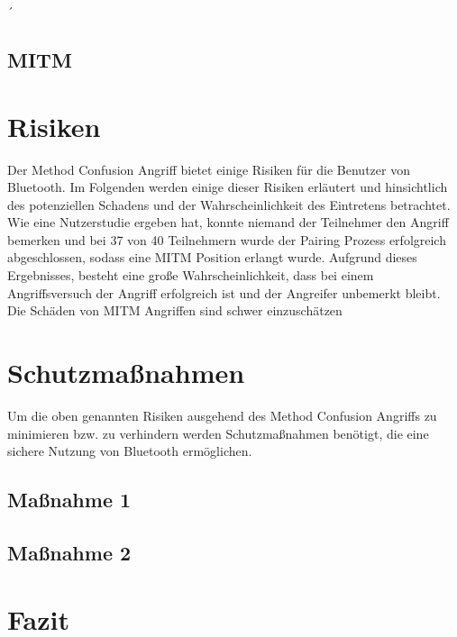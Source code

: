 ´\documentclass[
    a4paper,
    pagesize,
    pdftex,
    12pt,
]{scrartcl}
\begin{document}
    \subsection{MITM}

    \newpage
    \section{Risiken}
    Der Method Confusion Angriff bietet einige Risiken für die Benutzer von Bluetooth. Im Folgenden werden einige dieser Risiken erläutert und hinsichtlich des potenziellen Schadens und der Wahrscheinlichkeit des Eintretens betrachtet. \\
    Wie eine Nutzerstudie ergeben hat, konnte niemand der Teilnehmer den Angriff bemerken und bei 37 von 40 Teilnehmern wurde der Pairing Prozess erfolgreich abgeschlossen, sodass eine MITM Position erlangt wurde. \cite{method_confusion_attack} Aufgrund dieses Ergebnisses, besteht eine große Wahrscheinlichkeit, dass bei einem Angriffsversuch der Angriff erfolgreich ist und der Angreifer unbemerkt bleibt.
    Die Schäden von MITM Angriffen sind schwer einzuschätzen

    \newpage
    \section{Schutzmaßnahmen}
    Um die oben genannten Risiken ausgehend des Method Confusion Angriffs zu minimieren bzw. zu verhindern werden Schutzmaßnahmen benötigt, die eine sichere Nutzung von Bluetooth ermöglichen.
\subsection{Maßnahme 1}
\subsection{Maßnahme 2}

    \newpage
\section{Fazit}

    \newpage

    
    
\end{document}
